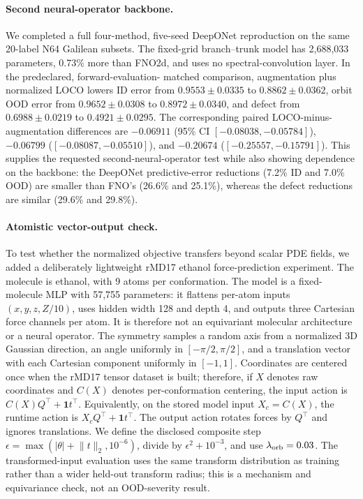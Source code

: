 \paragraph{Second neural-operator backbone.} We completed a full four-method,
five-seed DeepONet reproduction on the same 20-label N64 Galilean subsets.  The
fixed-grid branch--trunk model has 2,688,033 parameters, 0.73\% more than FNO2d,
and uses no spectral-convolution layer.  In the predeclared, forward-evaluation-
matched comparison, augmentation plus normalized LOCO lowers ID error from
\(0.9553\pm0.0335\) to \(0.8862\pm0.0362\), orbit OOD error from
\(0.9652\pm0.0308\) to \(0.8972\pm0.0340\), and defect from
\(0.6988\pm0.0219\) to \(0.4921\pm0.0295\).  The corresponding paired
LOCO-minus-augmentation differences are \(-0.06911\)
(95\% CI \([-0.08038,-0.05784]\)), \(-0.06799\)
(\([-0.08087,-0.05510]\)), and \(-0.20674\)
(\([-0.25557,-0.15791]\)).  This supplies the requested second-neural-operator
test while also showing dependence on the backbone: the DeepONet predictive-error
reductions (7.2\% ID and 7.0\% OOD) are smaller than FNO's (26.6\% and 25.1\%),
whereas the defect reductions are similar (29.6\% and 29.8\%).

\paragraph{Atomistic vector-output check.} To test whether the normalized objective transfers beyond scalar PDE fields, we added a deliberately lightweight rMD17 ethanol force-prediction experiment. The molecule is ethanol, with 9 atoms per conformation. The model is a fixed-molecule MLP with 57,755 parameters: it flattens per-atom inputs \((x,y,z,Z/10)\), uses hidden width 128 and depth 4, and outputs three Cartesian force channels per atom. It is therefore not an equivariant molecular architecture or a neural operator. The symmetry samples a random axis from a normalized 3D Gaussian direction, an angle uniformly in \([-\pi/2,\pi/2]\), and a translation vector with each Cartesian component uniformly in \([-1,1]\). Coordinates are centered once when the rMD17 tensor dataset is built; therefore, if \(X\) denotes raw coordinates and \(C(X)\) denotes per-conformation centering, the input action is \(C(X)Q^\top+\mathbf{1}t^\top\). Equivalently, on the stored model input \(X_c=C(X)\), the runtime action is \(X_cQ^\top+\mathbf{1}t^\top\). The output action rotates forces by \(Q^\top\) and ignores translations. We define the disclosed composite step \(\epsilon=\max(|\theta|+\lVert t\rVert_2,10^{-6})\), divide by \(\epsilon^2+10^{-3}\), and use \(\lambda_{\rm orb}=0.03\). The transformed-input evaluation uses the same transform distribution as training rather than a wider held-out transform radius; this is a mechanism and equivariance check, not an OOD-severity result.

